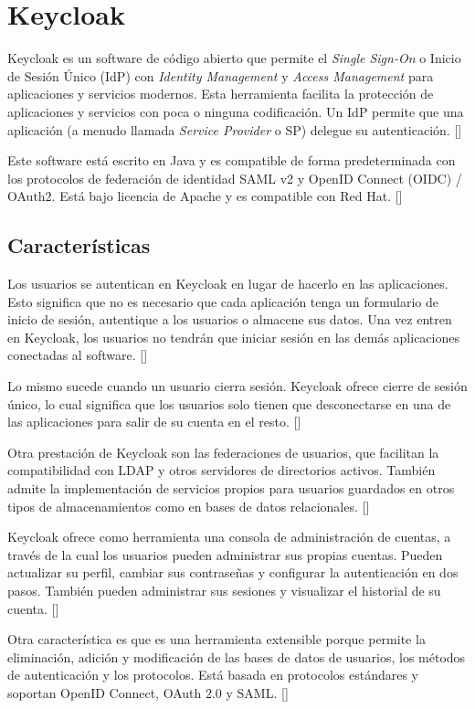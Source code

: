 \section{Keycloak}
Keycloak es un software de código abierto que permite el \emph{Single Sign-On} o Inicio de Sesión Único (IdP) con \emph{Identity Management} y \emph{Access Management} para aplicaciones y servicios modernos. Esta herramienta facilita la protección de aplicaciones y servicios con poca o ninguna codificación. Un IdP permite que una aplicación (a menudo llamada \emph{Service Provider} o SP) delegue su autenticación. [\cite{KeycloakDoc}]

Este software está escrito en Java y es compatible de forma predeterminada con los protocolos de federación de identidad SAML v2 y OpenID Connect (OIDC) / OAuth2. Está bajo licencia de Apache y es compatible con Red Hat. [\cite{KeycloakDoc}]

	\subsection{Características}
	Los usuarios se autentican en Keycloak en lugar de hacerlo en las aplicaciones. Esto significa que no es necesario que cada aplicación tenga un formulario de inicio de sesión, autentique a los usuarios o almacene sus datos. Una vez entren en Keycloak, los usuarios no tendrán que iniciar sesión en las demás aplicaciones conectadas al software. [\cite{KeycloakDoc}]
	
	Lo mismo sucede cuando un usuario cierra sesión. Keycloak ofrece cierre de sesión único, lo cual significa que los usuarios solo tienen que desconectarse en una de las aplicaciones para salir de su cuenta en el resto. [\cite{KeycloakDoc}]
	
	Otra prestación de Keycloak son las federaciones de usuarios, que facilitan la compatibilidad con LDAP y otros servidores de directorios activos. También admite la implementación de servicios propios para usuarios guardados en otros tipos de almacenamientos como en bases de datos relacionales. [\cite{KeycloakDoc}]
	
	Keycloak ofrece como herramienta una consola de administración de cuentas, a través de la cual los usuarios pueden administrar sus propias cuentas. Pueden actualizar su perfil, cambiar sus contraseñas y configurar la autenticación en dos pasos. También pueden administrar sus sesiones y visualizar el historial de su cuenta. [\cite{KeycloakDoc}]
	
	Otra característica es que es una herramienta extensible porque permite la eliminación, adición y modificación de las bases de datos de usuarios, los métodos de autenticación y los protocolos. Está basada en protocolos estándares y soportan OpenID Connect, OAuth 2.0 y SAML. [\cite{KeycloakDoc}]
	
